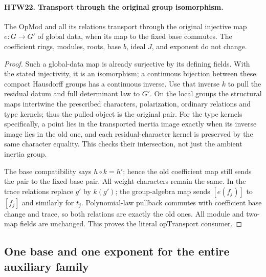 \documentclass[11pt,a4paper]{article}
\numberwithin{equation}{section}
\theoremstyle{remark}\newtheorem{remark}[theorem]{Remark}
\begin{document}
\paragraph{HTW22. Transport through the original group isomorphism.}
\label{claim:HTW22}
The \(\mathrm{OpMod}\) and all its relations transport
through the original injective map \(e:G\to G'\)
of global data, when its map to the fixed base
commutes.  The coefficient rings, modules, roots,
base \(b\), ideal \(J\), and exponent do not change.
\begin{proof}
Such a global-data map is already surjective by
its defining fields.  With the stated injectivity,
it is an isomorphism; a continuous bijection
between these compact Hausdorff groups has a
continuous inverse.  Use that inverse \(k\) to
pull the residual datum and full determinant law
to \(G'\).  On the local groups the structural
maps intertwine the prescribed characters,
polarization, ordinary relations and type kernels;
thus the pulled object is the original pair.
For the type kernels specifically, a point lies
in the transported inertia image exactly when
its inverse image lies in the old one, and each
residual-character kernel is preserved by the
same character equality.  This checks their
intersection, not just the ambient inertia group.

The base compatibility says \(h\circ k=h'\);
hence the old coefficient map still sends the
pair to the fixed base pair.  All weight
characters remain the same.  In the trace
relations replace \(g'\) by \(k(g')\);
the group-algebra map sends \([e(f_j)]\) to
\([f_j]\) and similarly for \(t_j\).
Polynomial-law pullback commutes with coefficient
base change and trace, so both relations are
exactly the old ones.  All module and two-map
fields are unchanged.  This proves the literal
\(\mathrm{opTransport}\) consumer.
\end{proof}

\subsection{One base and one exponent for the entire auxiliary family}

\end{document}
